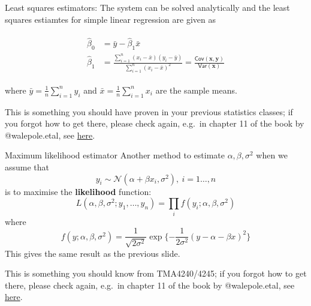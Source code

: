 \documentclass[
  10pt,
  ignorenonframetext,
]{beamer}
\begin{document}
\begin{frame}
\begin{block}{Least squares estimators:}
\protect\hypertarget{least-squares-estimators-1}{}
The system can be solved analytically and the least squares estiamtes
for simple linear regression are given as

\begin{align}
\begin{aligned}
\hat{\beta}_0 &= \bar{y}-\hat{\beta}_1 \bar{x}\\
\hat{\beta}_1 &= \frac{\sum_{i=1}^n(x_i-\bar{x})(y_i-\bar{y})}{\sum_{i=1}^n(x_i-\bar{x})^2} = \frac{\mathsf{Cov}(\boldsymbol{x},\boldsymbol{y})}{\mathsf{Var}(\boldsymbol{x})}
\end{aligned}
\end{align}

\vspace{2mm}

where \(\bar{y} = \frac{1}{n} \sum_{i=1}^n y_i\) and
\(\bar{x} = \frac{1}{n}\sum_{i=1}^n x_i\) are the sample means.

\vspace{6mm}
\scriptsize

This is something you should have proven in your previous statistics
classes; if you forgot how to get there, please check again, e.g.~in
chapter 11 of the book by @walepole.etal, see
\href{https://github.com/stefaniemuff/statlearning/blob/master/literature/Walepole_book.pdf}{here}.
\end{block}
\end{frame}

\begin{frame}
\begin{block}{Maximum likelihood estimator}
\protect\hypertarget{maximum-likelihood-estimator}{}
Another method to estimate \(\alpha,\beta,\sigma^2\) when we assume that
\[
y_i\sim\mathcal{N}(\alpha+\beta x_i,\sigma^2 ),\ i = 1\dots,n
\] is to maximise the \textbf{likelihood} function: \[
L(\alpha,\beta,\sigma^2;y_1,\dots,y_n) = \prod_i f(y_i;\alpha,\beta,\sigma^2)
\] where \[
f(y;\alpha,\beta,\sigma^2) = \frac{1}{\sqrt{2\sigma^2}}\exp\{-\frac{1}{2\sigma^2}(y-\alpha-\beta x)^2\}
\] This gives the same result as the previous slide.

\vspace{6mm}
\scriptsize

This is something you should know from TMA4240/4245; if you forgot how
to get there, please check again, e.g.~in chapter 11 of the book by
@walepole.etal, see
\href{https://github.com/stefaniemuff/statlearning/blob/master/literature/Walepole_book.pdf}{here}.
\end{block}
\end{frame}
\end{document}
